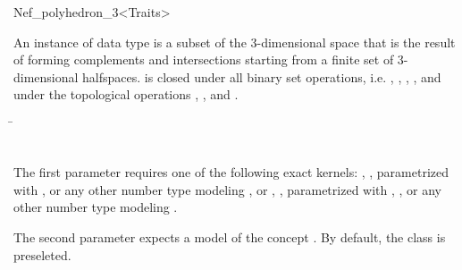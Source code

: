 
\ccRefPageBegin


\begin{ccRefClass}{Nef_polyhedron_3<Traits>}

\ccDefinition

An instance of data type  is a subset of the
3-dimensional space that is the result of forming complements and intersections
starting from a finite set  of
3-dimensional halfspaces.  is closed under all binary set
operations, i.e. , , ,
, and under the topological operations ,
, and .


\ccParameters

\begin{tabbing}
 \=\\
                 \>\\
\end{tabbing}

The first parameter requires one of the following exact kernels:
, ,  
parametrized with ,  or any other number type
modeling \Z, or , , 
 parametrized with , ,
 or any other number type modeling \Q.

The second parameter expects a model of the concept .
By default, the class  is preseleted.

\ccTypes



\end{ccRefClass}
